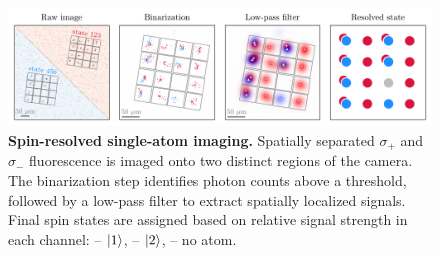 \begin{figure}[h]
    \centering
    \includegraphics{fig-py/imaging-spin-resolved.pdf}
    \caption{
        \textbf{Spin-resolved single-atom imaging.}
        Spatially separated $\sigma_+$ and $\sigma_-$ fluorescence is imaged onto two distinct regions of the camera. The binarization step identifies photon counts above a threshold, followed by a low-pass filter to extract spatially localized signals. Final spin states are assigned based on relative signal strength in each channel:
        \raisebox{-1pt}{\scalebox{1.5}{\textcolor{ublue}{\textbullet}}} -- $\left| 1 \right\rangle$, 
        \raisebox{-1pt}{\scalebox{1.5}{\textcolor{ured}{\textbullet}}} -- $\left| 2 \right\rangle$, 
        \raisebox{-1pt}{\scalebox{1.5}{\textcolor{uhole}{\textbullet}}} -- no atom.
    }
    \label{fig:spin-resolved}
\end{figure}


\newpage





